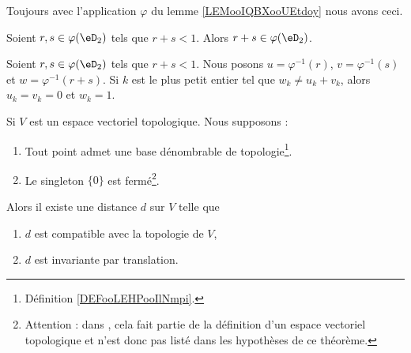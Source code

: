 Toujours avec l'application \( \varphi\) du lemme \ref{LEMooIQBXooUEtdoy} nous avons ceci.
\begin{lemma}       \label{LEMooVDPWooWLQzbF}
	Soient \( r,s\in \varphi(\eD_2)\) tels que \( r+s<1\). Alors \( r+s\in \varphi(\eD_2)\).
\end{lemma}

\begin{lemma}       \label{LEMooQYILooMimKHS}
	Soient \( r,s\in \varphi(\eD_2)\) tels que \( r+s<1\). Nous posons \( u=\varphi^{-1}(r)\), \( v=\varphi^{-1}(s)\) et \( w=\varphi^{-1}(r+s)\). Si \(k \) est le plus petit entier tel que \( w_k\neq u_k+v_k\), alors \( u_k=v_k=0\) et \( w_k=1\).
\end{lemma}

\begin{theorem}      \label{THOooAGBXooZnvQLK}
	Si \( V\) est un espace vectoriel topologique. Nous supposons :
	\begin{enumerate}
		\item
		      Tout point admet une base dénombrable de topologie\footnote{Définition \ref{DEFooLEHPooIlNmpi}.}.
		\item
		      Le singleton \( \{ 0 \}\) est fermé\footnote{Attention : dans \cite{ooMKWJooLSkGfh}, cela fait partie de la définition d'un espace vectoriel topologique et n'est donc pas listé dans les hypothèses de ce théorème.}.
	\end{enumerate}
	Alors il existe une distance \( d\) sur \( V\) telle que
	\begin{enumerate}
		\item
		      \( d\) est compatible avec la topologie de \( V\),
		\item
		      \( d\) est invariante par translation.
	\end{enumerate}
\end{theorem}

